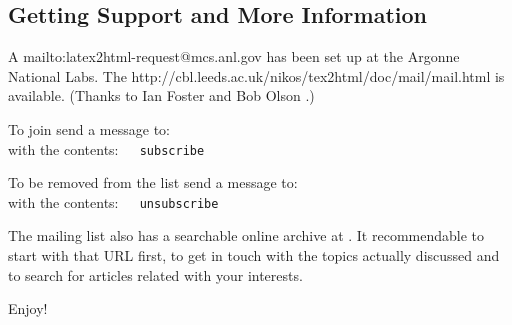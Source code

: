\subsection[center]{Getting Support and More Information\label{support}}%
%

A %
{mailto:latex2html-request@mcs.anl.gov} 
has been set up at the Argonne National Labs.  
The %
{http://cbl.leeds.ac.uk/nikos/tex2html/doc/mail/mail.html} is available.
\html{\\}
(Thanks to Ian Foster  
and Bob Olson .)

\smallskip\noindent
To join send a message to: 
\\
with the contents:~~\texttt{ subscribe }


\smallskip\noindent
To be removed from the list send a message to: 
\\
with the contents:~~\texttt{ unsubscribe }


\bigskip\noindent
The mailing list also has a searchable online archive at \ListURL.
It recommendable to start with that URL first, to get in touch with
the topics actually discussed and to search for articles related with
your interests.

\bigskip
Enjoy!

